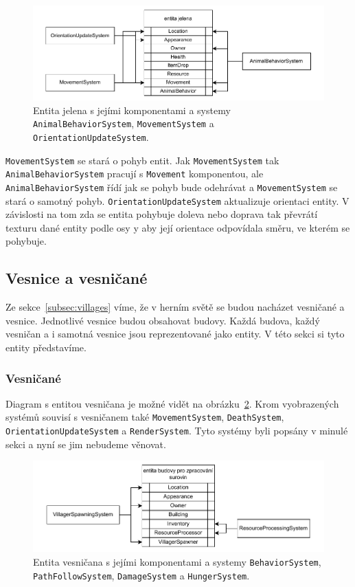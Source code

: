 \begin{figure}[!htb]
  \centering
  \includegraphics[width=1.0\linewidth]{img/deer.pdf}
  \caption{Entita jelena s jejími komponentami a systemy \texttt{AnimalBehaviorSystem}, \texttt{MovementSystem} a \texttt{OrientationUpdateSystem}.}
  \label{fig:deer}
\end{figure}

\texttt{MovementSystem} se stará o pohyb entit. Jak \texttt{MovementSystem} tak \texttt{AnimalBehaviorSystem} pracují s \texttt{Movement} komponentou, ale \texttt{AnimalBehaviorSystem} řídí jak se pohyb bude odehrávat a \texttt{MovementSystem} se stará o samotný pohyb. \texttt{OrientationUpdateSystem} aktualizuje orientaci entity. V závislosti na tom zda se entita pohybuje doleva nebo doprava tak převrátí texturu dané entity podle osy y aby její orientace odpovídala směru, ve kterém se pohybuje.

\subsection{Vesnice a vesničané}
Ze sekce~\ref{subsec:villages} víme, že v herním světě se budou nacházet vesničané a vesnice. Jednotlivé vesnice budou obsahovat budovy. Každá budova, každý vesničan a i samotná vesnice jsou reprezentované jako entity. V této sekci si tyto entity představíme.

\subsubsection{Vesničané}
Diagram s entitou vesničana je možné vidět na obrázku~\ref{fig:villager}. Krom vyobrazených systémů souvisí s vesničanem také \texttt{MovementSystem}, \texttt{DeathSystem}, \texttt{OrientationUpdateSystem} a \texttt{RenderSystem}. Tyto systémy byli popsány v minulé sekci a nyní se jim nebudeme věnovat.

\begin{figure}[!htb]
  \centering
  \includegraphics[width=1.0\linewidth]{img/villager.pdf}
  \caption{Entita vesničana s jejími komponentami a systemy \texttt{BehaviorSystem}, \texttt{PathFollowSystem}, \texttt{DamageSystem} a \texttt{HungerSystem}.}
  \label{fig:villager}
\end{figure}


